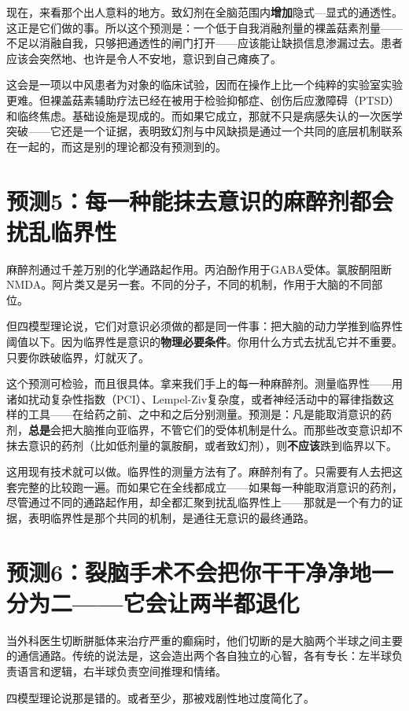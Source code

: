 \documentclass[11pt, twoside, openright]{book}
\begin{document}
现在，来看那个出人意料的地方。致幻剂在全脑范围内\textbf{增加}隐式---显式的通透性。这正是它们做的事。所以这个预测是：一个低于自我消融剂量的裸盖菇素剂量------不足以消融自我，只够把通透性的闸门打开------应该能让缺损信息渗漏过去。患者应该会突然地、也许是令人不安地，意识到自己瘫痪了。

这会是一项以中风患者为对象的临床试验，因而在操作上比一个纯粹的实验室实验更难。但裸盖菇素辅助疗法已经在被用于检验抑郁症、创伤后应激障碍（PTSD）和临终焦虑。基础设施是现成的。而如果它成立，那就不只是病感失认的一次医学突破------它还是一个证据，表明致幻剂与中风缺损是通过一个共同的底层机制联系在一起的，而这是别的理论都没有预测到的。

\section*{预测5：每一种能抹去意识的麻醉剂都会扰乱临界性}

麻醉剂通过千差万别的化学通路起作用。丙泊酚作用于GABA受体。氯胺酮阻断NMDA。阿片类又是另一套。不同的分子，不同的机制，作用于大脑的不同部位。

但四模型理论说，它们对意识必须做的都是同一件事：把大脑的动力学推到临界性阈值以下。因为临界性是意识的\textbf{物理必要条件}。你用什么方式去扰乱它并不重要。只要你跌破临界，灯就灭了。

这个预测可检验，而且很具体。拿来我们手上的每一种麻醉剂。测量临界性------用诸如扰动复杂性指数（PCI）、Lempel-Ziv复杂度，或者神经活动中的幂律指数这样的工具------在给药之前、之中和之后分别测量。预测是：凡是能取消意识的药剂，\textbf{总是}会把大脑推向亚临界，不管它们的受体机制是什么。而那些改变意识却不抹去意识的药剂（比如低剂量的氯胺酮，或者致幻剂），则\textbf{不应该}跌到临界以下。

这用现有技术就可以做。临界性的测量方法有了。麻醉剂有了。只需要有人去把这套完整的比较跑一遍。而如果它在全线都成立------如果每一种能取消意识的药剂，尽管通过不同的通路起作用，却全都汇聚到扰乱临界性上------那就是一个有力的证据，表明临界性是那个共同的机制，是通往无意识的最终通路。

\section*{预测6：裂脑手术不会把你干干净净地一分为二------它会让两半都退化}

当外科医生切断胼胝体来治疗严重的癫痫时，他们切断的是大脑两个半球之间主要的通信通路。传统的说法是，这会造出两个各自独立的心智，各有专长：左半球负责语言和逻辑，右半球负责空间推理和情绪。

四模型理论说那是错的。或者至少，那被戏剧性地过度简化了。
\end{document}

